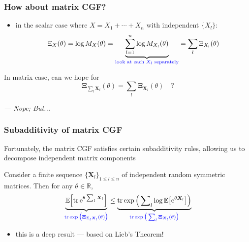 \documentclass[compress,
mathserif,wide,%
]{beamer}
\begin{document}
\begin{frame}
	\frametitle{How about matrix CGF?}
	\begin{itemize}
	\item in the scalar case where $X=X_{1}+\cdots+X_{n}$ with independent $\{X_{l}\}$:
	\[
		{\Xi}_{X }(\theta)  = \log M_{X}(\theta)=\underset{\textcolor{blue}{ \text{look at each }X_l\text{ separately}}}{\underbrace{ \sum_{l=1}^{n} \log M_{X_{l}}(\theta) }} = \sum_{l} {\Xi}_{{X}_{l}}(\theta)
	\]
\end{itemize}

\vfill

In matrix case, can we hope for
%
\[
\bm{\Xi}_{\sum_{l }\bm{X}_{l} }(\theta) = \sum_{l} \bm{\Xi}_{\bm{X}_{l}}(\theta) \quad ?
\]

{\hfill \em --- Nope; But...}
\end{frame}




\begin{frame}
\frametitle{Subadditivity of matrix CGF}  

Fortunately, the matrix CGF satisfies certain subadditivity rules, allowing us to decompose independent matrix components 

\bigskip


\begin{lemma}
	\label{lem:subadditive-CGF}
	Consider a finite sequence $\{\bm{X}_l\}_{1\leq l\leq n}$ of independent random symmetric matrices. Then for any $\theta \in \mathbb{R}$, 
	\[
		\underset{\textcolor{blue}{  \mathrm{tr} \exp\big(\bm{\Xi}_{\Sigma_{l}\bm{X}_{l}}(\theta)\big) }}{\underbrace{ \mathbb{E}\Big[\mathrm{tr}\,\mathrm{e}^{\theta\sum_{l}\bm{X}_{l}}\Big] }} 
		\leq
		\underset{\textcolor{blue}{  \mathrm{tr} \exp\big(\sum_{l}\bm{\Xi}_{\bm{X}_{l}}(\theta)\big) }}{\underbrace{ \mathrm{tr} \exp\Big(\sum\nolimits _{l}\log\mathbb{E}\big[\mathrm{e}^{\theta\bm{X}_{l}}\big]\Big) }}
	\]

	
\end{lemma}

	
\begin{itemize}
	\item this is a deep result --- based on Lieb's Theorem! 
\end{itemize}



\end{frame}
\end{document}
